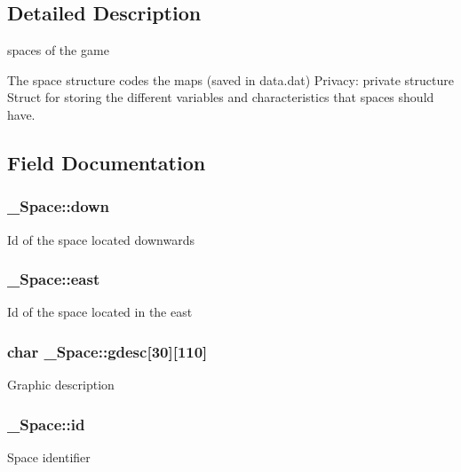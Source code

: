 \subsection{Detailed Description}
spaces of the game 

The space structure codes the maps (saved in data.\+dat) Privacy\+: private structure Struct for storing the different variables and characteristics that spaces should have. 

\subsection{Field Documentation}
\subsubsection[{\texorpdfstring{down}{down}}]{ \+\_\+\+Space\+::down}\hypertarget{struct__Space_ac20194f418676bb03cca7e0fdcb6f559}{}\label{struct__Space_ac20194f418676bb03cca7e0fdcb6f559}
Id of the space located downwards 
\subsubsection[{\texorpdfstring{east}{east}}]{ \+\_\+\+Space\+::east}\hypertarget{struct__Space_a41ce2bf33cf0c157b358221f094ee05b}{}\label{struct__Space_a41ce2bf33cf0c157b358221f094ee05b}
Id of the space located in the east 
\subsubsection[{\texorpdfstring{gdesc}{gdesc}}]{\setlength{\rightskip}{0pt plus 5cm}char \+\_\+\+Space\+::gdesc\mbox{[}30\mbox{]}\mbox{[}110\mbox{]}}\hypertarget{struct__Space_a60637342523b393b7cae073324f57be2}{}\label{struct__Space_a60637342523b393b7cae073324f57be2}
Graphic description 
\subsubsection[{\texorpdfstring{id}{id}}]{ \+\_\+\+Space\+::id}\hypertarget{struct__Space_a70cb461deb9ac073e401b607339b567f}{}\label{struct__Space_a70cb461deb9ac073e401b607339b567f}
Space identifier 
